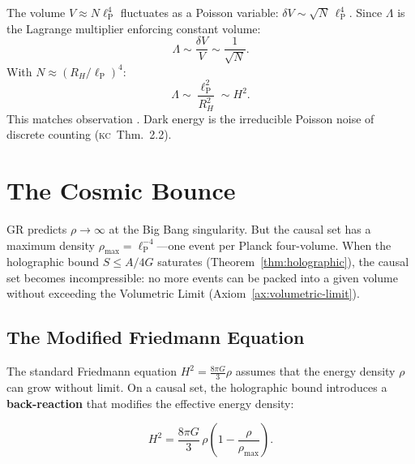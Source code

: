 \documentclass[11pt, a4paper, openany]{book}
\newcommand{\lP}{\ell_{\mathrm{P}}}
\newcommand{\KC}[1]{\textnormal{(\textsc{kc}~#1)}}
\newcounter{thm}[chapter]
\begin{document}
The volume $V \approx N\lP^4$ fluctuates as a Poisson variable:
$\delta V \sim \sqrt{N}\,\lP^4$. Since $\Lambda$ is the Lagrange
multiplier enforcing constant volume:
\begin{equation}
  \Lambda \sim \frac{\delta V}{V} \sim \frac{1}{\sqrt{N}}.
\end{equation}
With $N \approx (R_H/\lP)^4$:
\begin{equation}
  \Lambda \sim \frac{\lP^2}{R_H^2} \sim H^2.
\end{equation}
This matches observation \cite{ahmed2004,sorkin2005lambda}. Dark energy is
the irreducible Poisson noise of discrete counting \KC{Thm.~2.2}.

\section{The Cosmic Bounce}\label{sec:bounce}

GR predicts $\rho \to \infty$ at the Big Bang singularity. But the
causal set has a maximum density $\rho_{\max} = \lP^{-4}$---one event
per Planck four-volume. When the holographic bound
$S \le A/4G$ saturates (Theorem~\ref{thm:holographic}), the causal set
becomes incompressible: no more events can be packed into a given
volume without exceeding the Volumetric Limit (Axiom~\ref{ax:volumetric-limit}).

\subsection{The Modified Friedmann Equation}

The standard Friedmann equation $H^2 = \frac{8\pi G}{3}\rho$ assumes
that the energy density $\rho$ can grow without limit. On a causal set,
the holographic bound introduces a \textbf{back-reaction} that modifies
the effective energy density:

\begin{equation}\label{eq:bounce}
  H^2 = \frac{8\pi G}{3}\,\rho\left(1 - \frac{\rho}{\rho_{\max}}\right).
\end{equation}
\end{document}
